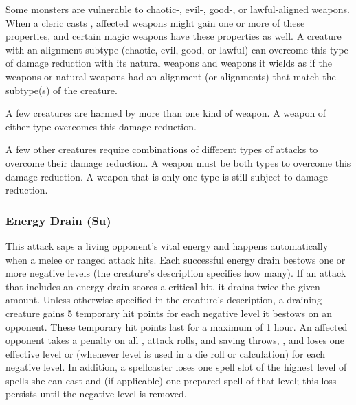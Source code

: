 {Some monsters are vulnerable to chaotic-, evil-, good-, or lawful-aligned weapons. When a cleric casts , affected weapons might gain one or more of these properties, and certain magic weapons have these properties as well. A creature with an alignment subtype (chaotic, evil, good, or lawful) can overcome this type of damage reduction with its natural weapons and weapons it wields as if the weapons or natural weapons had an alignment (or alignments) that match the subtype(s) of the creature.

A few creatures are harmed by more than one kind of weapon. A weapon of either type overcomes this damage reduction.

A few other creatures require combinations of different types of attacks to overcome their damage reduction. A weapon must be both types to overcome this damage reduction. A weapon that is only one type is still subject to damage reduction.

\subsubsection{Energy Drain (Su)} This attack saps a living opponent's vital energy and happens automatically when a melee or ranged attack hits. Each successful energy drain bestows one or more negative levels (the creature's description specifies how many). If an attack that includes an energy drain scores a critical hit, it drains twice the given amount. Unless otherwise specified in the creature's description, a draining creature gains 5 temporary hit points for each negative level it bestows on an opponent. These temporary hit points last for a maximum of 1 hour. An affected opponent takes a  penalty on all , attack rolls, and saving throws, , and loses one effective level or  (whenever level is used in a die roll or calculation) for each negative level.  In addition, a spellcaster loses one spell slot of the highest level of spells she can cast and (if applicable) one prepared spell of that level; this loss persists until the negative level is removed. 

}
